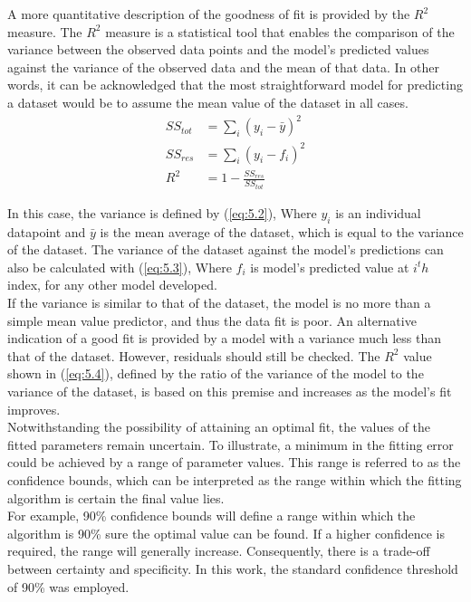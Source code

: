 \noindent A more quantitative description of the goodness of fit is provided by the $R^2$ measure. The $R^2$ measure is a statistical tool that enables the comparison of the variance between the observed data points and the model's predicted values against the variance of the observed data and the mean of that data. In other words, it can be acknowledged that the most straightforward model for predicting a dataset would be to assume the mean value of the dataset in all cases.
\begin{align}
SS_{tot} &= \sum_{i}\left( y_i - \bar y \right)^2 \label{eq:5.2} \\
SS_{res} &= \sum_{i}\left( y_i - f_i \right)^2 \label{eq:5.3} \\
 R^2 &= 1 - \frac{SS_{res}}{SS_{tot}} \label{eq:5.4} 
\end{align}

\noindent In this case, the variance is defined by (\ref{eq:5.2}), Where $y_i$ is an individual datapoint and $\bar y$ is the mean average of the dataset, which is equal to the variance of the dataset. The variance of the dataset against the model's predictions can also be calculated with (\ref{eq:5.3}), Where $f_i$ is model’s predicted value at $i^th$ index, for any other model developed. \\

\noindent If the variance is similar to that of the dataset, the model is no more than a simple mean value predictor, and thus the data fit is poor. An alternative indication of a good fit is provided by a model with a variance much less than that of the dataset. However, residuals should still be checked. The $R^2$ value shown in (\ref{eq:5.4}), defined by the ratio of the variance of the model to the variance of the dataset, is based on this premise and increases as the model's fit improves.\\

\noindent Notwithstanding the possibility of attaining an optimal fit, the values of the fitted parameters remain uncertain. To illustrate, a minimum in the fitting error could be achieved by a range of parameter values. This range is referred to as the confidence bounds, which can be interpreted as the range within which the fitting algorithm is certain the final value lies. \\

\noindent For example, 90\% confidence bounds will define a range within which the algorithm is 90\% sure the optimal value can be found. If a higher confidence is required, the range will generally increase. Consequently, there is a trade-off between certainty and specificity. In this work, the standard confidence threshold of 90\% was employed.\\

